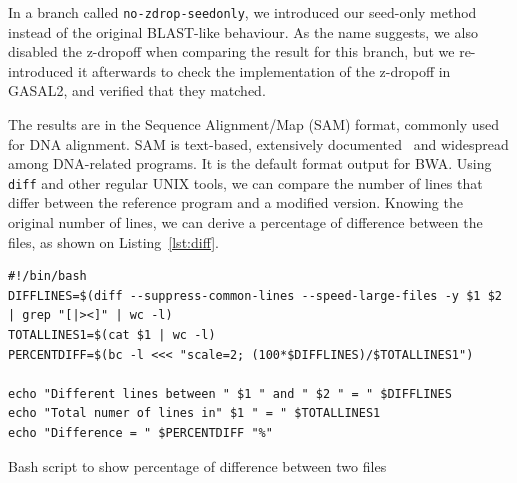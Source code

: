 In a branch called \verb|no-zdrop-seedonly|, we introduced our seed-only method instead of the original BLAST-like behaviour. As the name suggests, we also disabled the z-dropoff when comparing the result for this branch, but we re-introduced it afterwards to check the implementation of the z-dropoff in GASAL2, and verified that they matched.

The results are in the Sequence Alignment/Map (SAM) format, commonly used for DNA alignment. SAM is text-based, extensively documented~\cite{samtools:sam} and widespread among DNA-related programs. It is the default format output for BWA. Using \verb|diff| and other regular UNIX tools, we can compare the number of lines that differ between the reference program and a modified version. Knowing the original number of lines, we can derive a percentage of difference between the files, as shown on Listing~\ref{lst:diff}.

\begin{listing}[ht]
	\begin{verbatim}
#!/bin/bash
DIFFLINES=$(diff --suppress-common-lines --speed-large-files -y $1 $2 | grep "[|><]" | wc -l)
TOTALLINES1=$(cat $1 | wc -l)
PERCENTDIFF=$(bc -l <<< "scale=2; (100*$DIFFLINES)/$TOTALLINES1")

echo "Different lines between " $1 " and " $2 " = " $DIFFLINES
echo "Total numer of lines in" $1 " = " $TOTALLINES1
echo "Difference = " $PERCENTDIFF "%"
	\end{verbatim}
	\caption{Bash script to show percentage of difference between two files}
	\label{lst:diff}
\end{listing}

